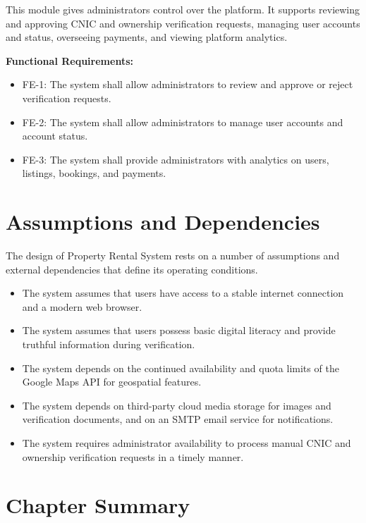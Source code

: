 This module gives administrators control over the platform. It supports reviewing and approving CNIC and ownership verification requests, managing user accounts and status, overseeing payments, and viewing platform analytics.

\textbf{Functional Requirements:}

\begin{itemize}
    \item FE-1: The system shall allow administrators to review and approve or reject verification requests.
    \item FE-2: The system shall allow administrators to manage user accounts and account status.
    \item FE-3: The system shall provide administrators with analytics on users, listings, bookings, and payments.
\end{itemize}


\section{Assumptions and Dependencies}

The design of Property Rental System rests on a number of assumptions and external dependencies that define its operating conditions.

\begin{itemize}
    \item The system assumes that users have access to a stable internet connection and a modern web browser.
    \item The system assumes that users possess basic digital literacy and provide truthful information during verification.
    \item The system depends on the continued availability and quota limits of the Google Maps API for geospatial features.
    \item The system depends on third-party cloud media storage for images and verification documents, and on an SMTP email service for notifications.
    \item The system requires administrator availability to process manual CNIC and ownership verification requests in a timely manner.
\end{itemize}

\section{Chapter Summary}


